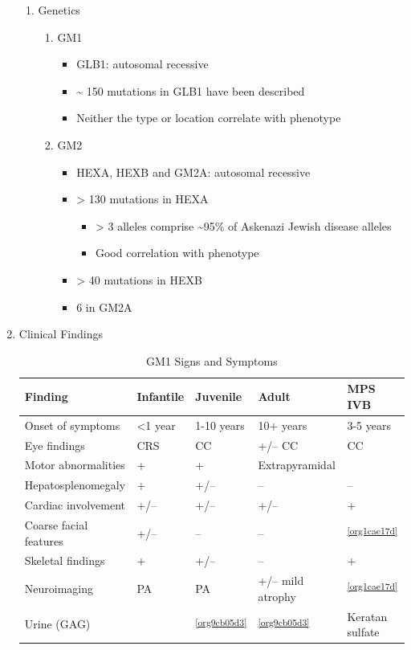 \documentclass{scrartcl}
\begin{document}
\begin{enumerate}
\begin{enumerate}
\item Genetics
\label{sec:org308cdc1}
\begin{enumerate}
\item GM1
\label{sec:orgb6024f0}
\begin{itemize}
\item GLB1: autosomal recessive
\item \textasciitilde{} 150 mutations in GLB1 have been described
\item Neither the type or location correlate with phenotype
\end{itemize}

\item GM2
\label{sec:org97f4efa}
\begin{itemize}
\item HEXA, HEXB and GM2A: autosomal recessive
\item > 130 mutations in HEXA
\begin{itemize}
\item > 3 alleles comprise \textasciitilde{}95\% of Askenazi Jewish disease alleles
\item Good correlation with phenotype
\end{itemize}
\item > 40 mutations in HEXB
\item 6 in GM2A
\end{itemize}
\end{enumerate}
\end{enumerate}

\item Clinical Findings
\label{sec:orgc7dc1e5}

\begin{table}[htbp]
\caption[ GM1 Signs and Symptoms]{\label{tab:org31963e6}
GM1 Signs and Symptoms}
\centering
\begin{tabular}{lllll}
Finding & Infantile & Juvenile & Adult & MPS IVB\\
\hline
Onset of symptoms & <1 year & 1-10 years & 10+ years & 3-5 years\\
Eye findings & CRS & CC & +/– CC & CC\\
Motor abnormalities & + & + & Extrapyramidal & \footnotemark\\
Hepatosplenomegaly & + & +/– & – & –\\
Cardiac involvement & +/– & +/– & +/– & +\\
Coarse facial features & +/– & – & – & \textsuperscript{\ref{org1cae17d}}\\
Skeletal findings & + & +/– & – & +\\
Neuroimaging & PA & PA & +/– mild atrophy & \textsuperscript{\ref{org1cae17d}}\\
Urine (GAG) & \footnotemark & \textsuperscript{\ref{org9cb05d3}} & \textsuperscript{\ref{org9cb05d3}} & Keratan sulfate \footnotemark\\
\end{tabular}
\end{table}


\end{enumerate}
\end{document}
